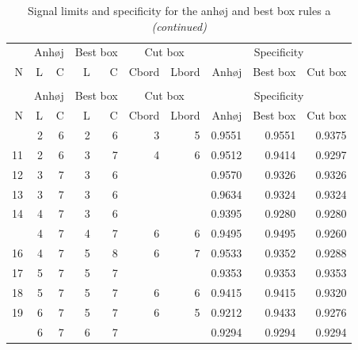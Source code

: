 \begin{Schunk}

\begin{longtable}{rrrrrrrrrr}
\caption{\label{tab:unnamed-chunk-1}Signal limits and specificity for the anhøj and best box rules and 
        borders for the cut box rules. N = number of trials. L = upper limit 
        for longest run, C = lower limit for number of crossings, Cbord and 
        Lbord = cut box borders to keep.}\\
\toprule
\multicolumn{1}{c}{ } & \multicolumn{2}{c}{Anhøj} & \multicolumn{2}{c}{Best box} & \multicolumn{2}{c}{Cut box} & \multicolumn{3}{c}{Specificity} \\
\cmidrule(l{3pt}r{3pt}){2-3} \cmidrule(l{3pt}r{3pt}){4-5} \cmidrule(l{3pt}r{3pt}){6-7} \cmidrule(l{3pt}r{3pt}){8-10}
N & L & C & L & C & Cbord & Lbord & Anhøj & Best box & Cut box\\
\midrule
\endfirsthead
\caption[]{Signal limits and specificity for the anhøj and best box rules a \textit{(continued)}}\\
\toprule
\multicolumn{1}{c}{ } & \multicolumn{2}{c}{Anhøj} & \multicolumn{2}{c}{Best box} & \multicolumn{2}{c}{Cut box} & \multicolumn{3}{c}{Specificity} \\
\cmidrule(l{3pt}r{3pt}){2-3} \cmidrule(l{3pt}r{3pt}){4-5} \cmidrule(l{3pt}r{3pt}){6-7} \cmidrule(l{3pt}r{3pt}){8-10}
N & L & C & L & C & Cbord & Lbord & Anhøj & Best box & Cut box\\
\midrule
\endhead
\
\endfoot
\bottomrule
\endlastfoot
10 & 2 & 6 & 2 & 6 & 3 & 5 & 0.9551 & 0.9551 & 0.9375\\
11 & 2 & 6 & 3 & 7 & 4 & 6 & 0.9512 & 0.9414 & 0.9297\\
12 & 3 & 7 & 3 & 6 &  &  & 0.9570 & 0.9326 & 0.9326\\
13 & 3 & 7 & 3 & 6 &  &  & 0.9634 & 0.9324 & 0.9324\\
14 & 4 & 7 & 3 & 6 &  &  & 0.9395 & 0.9280 & 0.9280\\
\addlinespace
15 & 4 & 7 & 4 & 7 & 6 & 6 & 0.9495 & 0.9495 & 0.9260\\
16 & 4 & 7 & 5 & 8 & 6 & 7 & 0.9533 & 0.9352 & 0.9288\\
17 & 5 & 7 & 5 & 7 &  &  & 0.9353 & 0.9353 & 0.9353\\
18 & 5 & 7 & 5 & 7 & 6 & 6 & 0.9415 & 0.9415 & 0.9320\\
19 & 6 & 7 & 5 & 7 & 6 & 5 & 0.9212 & 0.9433 & 0.9276\\
\addlinespace
20 & 6 & 7 & 6 & 7 &  &  & 0.9294 & 0.9294 & 0.9294\\

\end{longtable}
\end{Schunk}
